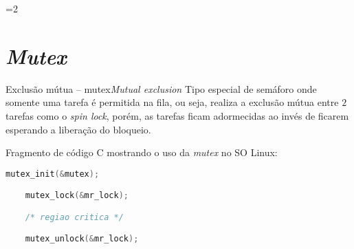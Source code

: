 
=2


\section{\insertlecture}

\def\thetitle{\em Mutex}
\section{\thetitle}

\begin{frame}[fragile]{Exclusão mútua -- mutex}{\em Mutual exclusion}
  \small
  Tipo especial de semáforo onde somente uma tarefa é permitida na
  fila, ou seja, realiza a exclusão mútua entre $2$ tarefas como o
  \alert{\em spin lock}, porém, as tarefas ficam \alert{adormecidas} ao invés de
  ficarem esperando a liberação do bloqueio.\\
\bigskip

Fragmento de código C mostrando o uso da \alert{\em mutex} no SO Linux:

  \begin{lstlisting}[language=c,frame=single]
    mutex_init(&mutex);

    mutex_lock(&mr_lock);

    /* regiao critica */

    mutex_unlock(&mr_lock);
  \end{lstlisting}
  
\end{frame}

\def\thetitle{Semáforos}
